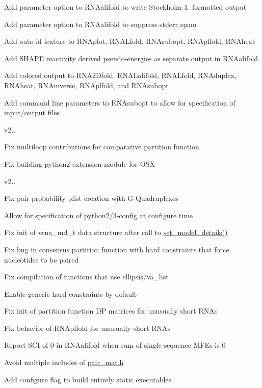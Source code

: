 \begin{DoxyItemize}
\item Add parameter option to R\+N\+Aalifold to write Stockholm 1. formatted output
\item Add parameter option to R\+N\+Aalifold to suppress stderr spam
\item Add auto-\/id feature to R\+N\+Aplot, R\+N\+A\+Lfold, R\+N\+Asubopt, R\+N\+Aplfold, R\+N\+Aheat
\item Add S\+H\+A\+PE reactivity derived pseudo-\/energies as separate output in R\+N\+Aalifold
\item Add colored output to R\+N\+A2\+Dfold, R\+N\+A\+Lalifold, R\+N\+A\+Lfold, R\+N\+Aduplex, R\+N\+Aheat, R\+N\+Ainverse, R\+N\+Aplfold, and R\+N\+Asubopt
\item Add command line parameters to R\+N\+Asubopt to allow for specification of input/output files
\end{DoxyItemize}

v2..
\begin{DoxyItemize}
\item Fix multiloop contributions for comparative partition function
\item Fix building python2 extension module for O\+SX
\end{DoxyItemize}

v2..
\begin{DoxyItemize}
\item Fix pair probability plist creation with G-\/\+Quadruplexes
\item Allow for specification of python2/3-\/config at configure time
\item Fix init of vrna\+\_\+md\+\_\+t data structure after call to \hyperlink{group__model__details_gabad896c3650d420f3f3ddefc69e2bceb}{set\+\_\+model\+\_\+details()}
\item Fix bug in consensus partition function with hard constraints that force nucleotides to be paired
\item Fix compilation of functions that use ellipsis/va\+\_\+list
\item Enable generic hard constraints by default
\item Fix init of partition function DP matrices for unusually short R\+N\+As
\item Fix behavior of R\+N\+Aplfold for unusually short R\+N\+As
\item Report S\+CI of 0 in R\+N\+Aalifold when sum of single sequence M\+F\+Es is 0
\item Avoid multiple includes of \hyperlink{pair__mat_8h_source}{pair\+\_\+mat.\+h}
\item Add configure flag to build entirely static executables
\end{DoxyItemize}

